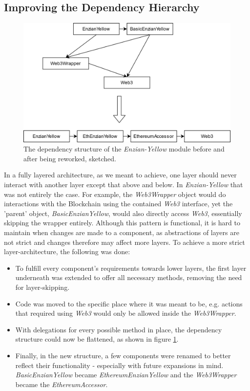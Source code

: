 \subsection{Improving the Dependency Hierarchy}
\label{sec:impr:enzian:dep}

\begin{figure}[h]
	\centering
	\captionsetup{justification=centering,margin=2cm}
	\includegraphics[height=0.5\textwidth]{gfx/enzian-dependencies}
	\caption{The dependency structure of the \emph{Enzian-Yellow} module before and after being reworked, sketched.}
	\label{fig:impr:enzian:dependencies}
\end{figure}

In a fully layered architecture, as we meant to achieve, one layer should never interact with another layer except that above and below. In \emph{Enzian-Yellow} that was not entirely the case. For example, the \emph{Web3Wrapper} object would do interactions with the Blockchain using the contained \emph{Web3} interface, yet the 'parent' object, \emph{BasicEnzianYellow}, would also directly access \emph{Web3}, essentially skipping the wrapper entirely. Although this pattern is functional, it is hard to maintain when changes are made to a component, as abstractions of layers are not strict and changes therefore may affect more layers. To achieve a more strict layer-architecture, the following was done:
\begin{itemize}
    \item To fulfill every component's requirements towards lower layers, the first layer underneath was extended to offer all necessary methods, removing the need for layer-skipping.
    \item Code was moved to the specific place where it was meant to be, e.g. actions that required using \emph{Web3} would only be allowed inside the \emph{Web3Wrapper}.
    \item With delegations for every possible method in place, the dependency structure could now be flattened, as shown in figure \ref{fig:impr:enzian:dependencies}.
    \item Finally, in the new structure, a few components were renamed to better reflect their functionality - especially with future expansions in mind. \emph{BasicEnzianYellow} became \emph{EthereumEnzianYellow} and the \emph{Web3Wrapper} became the \emph{EthereumAccessor}.
\end{itemize}

